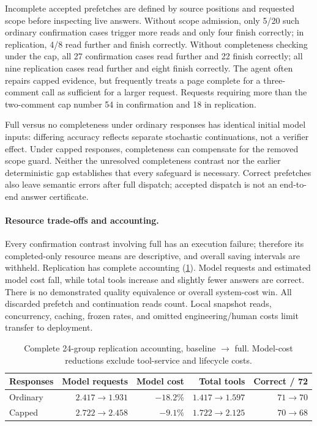 Incomplete accepted prefetches are defined by source positions and requested
scope before inspecting live answers. Without scope admission, only 5/20 such
ordinary confirmation cases trigger more reads and only four finish correctly;
in replication, 4/8 read further and finish correctly. Without completeness
checking under the cap, all 27 confirmation cases read further and 22 finish
correctly; all nine replication cases read further and eight finish correctly.
The agent often repairs capped evidence, but frequently treats a page complete
for a three-comment call as sufficient for a larger request. Requests requiring
more than the two-comment cap number 54 in confirmation and 18 in replication.

Full versus no completeness under ordinary responses has identical initial
model inputs: differing accuracy reflects separate stochastic continuations,
not a verifier effect. Under capped responses, completeness can compensate for
the removed scope guard. Neither the unresolved completeness contrast nor the
earlier deterministic gap establishes that every safeguard is necessary.
Correct prefetches also leave semantic errors after full dispatch; accepted
dispatch is not an end-to-end answer certificate.

\paragraph{Resource trade-offs and accounting.}
Every confirmation contrast involving full has an execution failure; therefore
its completed-only resource means are descriptive, and overall saving intervals
are withheld. Replication has complete accounting (\cref{tab:recovery-resources}).
Model requests and estimated model cost fall, while total tools increase and
slightly fewer answers are correct. There is no demonstrated quality equivalence
or overall system-cost win. All discarded prefetch and continuation reads count.
Local snapshot reads, concurrency, caching, frozen rates, and omitted
engineering/human costs limit transfer to deployment.

\begin{table}[t]
\centering
\caption{Complete 24-group replication accounting, baseline $\to$ full.
Model-cost reductions exclude tool-service and lifecycle costs.}
\label{tab:recovery-resources}
\small
\begin{tabular}{@{}lrrrr@{}}
\toprule
Responses & Model requests & Model cost & Total tools & Correct / 72 \\
\midrule
Ordinary & $2.417\to1.931$ & $-18.2\%$ & $1.417\to1.597$ & $71\to70$ \\
Capped & $2.722\to2.458$ & $-9.1\%$ & $1.722\to2.125$ & $70\to68$ \\
\bottomrule
\end{tabular}
\end{table}

